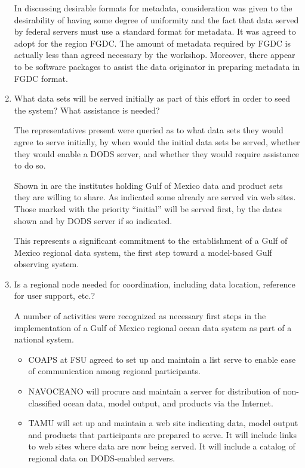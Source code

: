 \begin{enumerate}
In discussing desirable formats for metadata, consideration was given to the desirability of 
having some degree of uniformity and the fact that data served by federal servers must use a 
standard format for metadata. It was agreed to adopt for the region FGDC. The amount of 
metadata required by FGDC is actually less than agreed necessary by the workshop. Moreover, 
there appear to be software packages to assist the data originator in preparing metadata in FGDC 
format.

\item What data sets will be served initially as part of this effort in order to seed the system? What 
assistance is needed?

The representatives present were queried as to what data sets they would agree to serve initially, 
by when would the initial data sets be served, whether they would enable a DODS server, and 
whether they would require assistance to do so.

Shown in  are the institutes holding Gulf of
Mexico data and product sets they are willing to share. As indicated
some already are served via web sites. Those marked with the priority
``initial'' will be served first, by the dates shown and by DODS
server if so indicated.

This represents a significant commitment to the establishment of a Gulf of Mexico regional data 
system, the first step toward a model-based Gulf observing system.

\item Is a regional node needed for coordination, including data location, reference for user support, 
etc.?

A number of activities were recognized as necessary first steps in the implementation of a Gulf 
of Mexico regional ocean data system as part of a national system.

\begin{itemize}
\item    COAPS at FSU agreed to set up and maintain a list serve to enable ease of communication 
among regional participants. 

\item   NAVOCEANO will procure and maintain a server for distribution of non-classified ocean 
data, model output, and products via the Internet.

\item   TAMU will set up and maintain a web site indicating data, model output and products that 
participants are prepared to serve. It will include links to web sites where data are now 
being served. It will include a catalog of regional data on DODS-enabled servers.


\end{itemize}
\end{enumerate}
